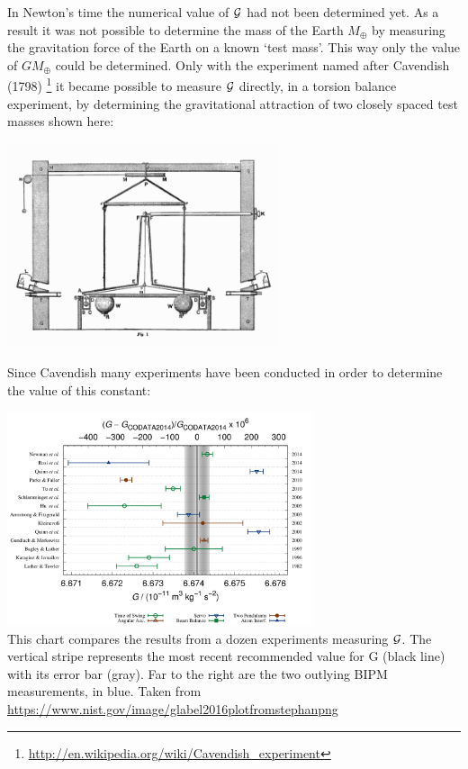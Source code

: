 In Newton's time the numerical value of ${\cal G}$ had not been
determined yet. 
As a result it was not possible to determine the mass of the 
Earth $M_{\oplus}$ by measuring the gravitation force of the Earth 
on a known `test mass'.
This way only the value of $G M_{\oplus}$ could be determined.
Only with the experiment named after Cavendish (1798)
\footnote{\url{http://en.wikipedia.org/wiki/Cavendish_experiment}}
it became possible
to measure ${\cal G}$ directly, in a torsion balance experiment,
by determining the gravitational attraction of two closely spaced test 
masses shown here:  

\begin{center}
\includegraphics[width=8cm]{images/gravity/Cavendish_Experiment}
\end{center}

Since Cavendish many experiments have been conducted in order to 
determine the value of this constant:

\begin{center}
\includegraphics[width=9cm]{images/gravity/big_G}\\
{\captionfont This chart compares the results from a dozen experiments measuring ${\cal G}$. 
The vertical stripe represents the most recent recommended value for G (black line) 
with its error bar (gray). Far to the right are the two outlying BIPM measurements, in blue.
Taken from \url{https://www.nist.gov/image/glabel2016plotfromstephanpng}}
\end{center}

